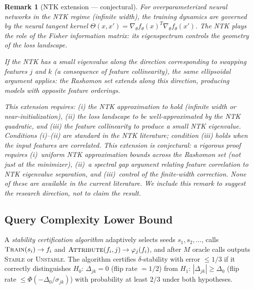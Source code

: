 \documentclass{article}
\newtheorem{remark}[theorem]{Remark}
\begin{document}
\begin{remark}[NTK extension --- conjectural]
For overparameterized neural networks in the NTK regime
(infinite width), the training dynamics are governed by the
neural tangent kernel $\Theta(x, x') = \nabla_\theta f_\theta(x)^T
\nabla_\theta f_\theta(x')$. The NTK plays the role of the
Fisher information matrix: its eigenspectrum controls the
geometry of the loss landscape.

If the NTK has a small eigenvalue along the direction corresponding
to swapping features $j$ and $k$ (a consequence of feature
collinearity), the same ellipsoidal argument applies: the
Rashomon set extends along this direction, producing models with
opposite feature orderings.

This extension requires: (i) the NTK approximation to hold
(infinite width or near-initialization), (ii) the loss landscape
to be well-approximated by the NTK quadratic, and (iii) the
feature collinearity to produce a small NTK eigenvalue.
Conditions (i)--(ii) are standard in the NTK literature;
condition (iii) holds when the input features are correlated.
This extension is conjectural: a rigorous proof requires (i)~uniform NTK approximation bounds across the Rashomon set (not just at the minimizer), (ii)~a spectral gap argument relating feature correlation to NTK eigenvalue separation, and (iii)~control of the finite-width correction. None of these are available in the current literature. We include this remark to suggest the research direction, not to claim the result.
\end{remark}

\subsection{Query Complexity Lower Bound}
\label{sec:query}

\begin{sloppypar}
A \emph{stability certification algorithm} adaptively selects seeds $s_1, s_2, \ldots$,
calls $\textsc{Train}(s_i) \to f_i$ and $\textsc{Attribute}(f_i, j) \to \varphi_j(f_i)$,
and after $M$ oracle calls outputs \textsc{Stable} or \textsc{Unstable}. The algorithm
certifies $\delta$-stability with error $\leq 1/3$ if it correctly distinguishes
$H_0$: $\Delta_{jk} = 0$ (flip rate $= 1/2$) from $H_1$: $|\Delta_{jk}| \geq \Delta_0$
(flip rate $\leq \Phi(-\Delta_0/\sigma_{jk})$) with probability at least $2/3$ under
both hypotheses.
\end{sloppypar}
\end{document}
